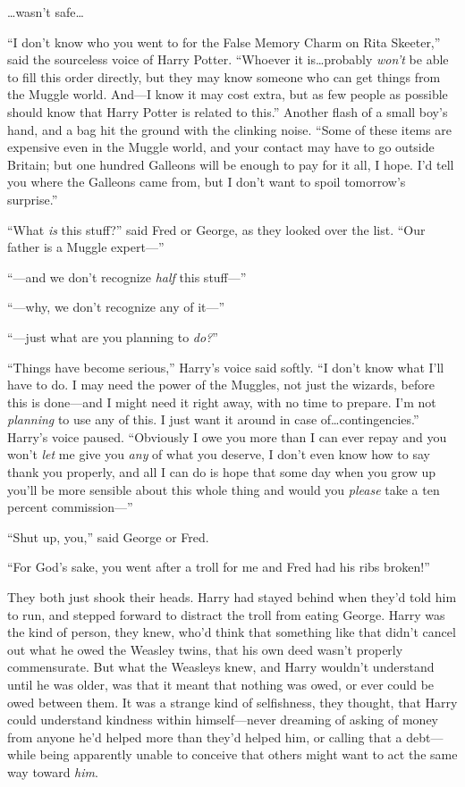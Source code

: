 …wasn’t safe…

“I don’t know who you went to for the False Memory Charm on Rita Skeeter,” said the sourceless voice of Harry Potter. “Whoever it is…probably \emph{won’t} be able to fill this order directly, but they may know someone who can get things from the Muggle world. And—I know it may cost extra, but as few people as possible should know that Harry Potter is related to this.” Another flash of a small boy’s hand, and a bag hit the ground with the clinking noise. “Some of these items are expensive even in the Muggle world, and your contact may have to go outside Britain; but one hundred Galleons will be enough to pay for it all, I hope. I’d tell you where the Galleons came from, but I don’t want to spoil tomorrow’s surprise.”

“What \emph{is} this stuff?” said Fred or George, as they looked over the list. “Our father is a Muggle expert—”

“—and we don’t recognize \emph{half} this stuff—”

“—why, we don’t recognize any of it—”

“—just what are you planning to \emph{do?}”

“Things have become serious,” Harry’s voice said softly. “I don’t know what I’ll have to do. I may need the power of the Muggles, not just the wizards, before this is done—and I might need it right away, with no time to prepare. I’m not \emph{planning} to use any of this. I just want it around in case of…contingencies.” Harry’s voice paused. “Obviously I owe you more than I can ever repay and you won’t \emph{let} me give you \emph{any} of what you deserve, I don’t even know how to say thank you properly, and all I can do is hope that some day when you grow up you’ll be more sensible about this whole thing and would you \emph{please} take a ten percent commission—”

“Shut up, you,” said George or Fred.

“For God’s sake, you went after a troll for me and Fred had his ribs broken!”

They both just shook their heads. Harry had stayed behind when they’d told him to run, and stepped forward to distract the troll from eating George. Harry was the kind of person, they knew, who’d think that something like that didn’t cancel out what he owed the Weasley twins, that his own deed wasn’t properly commensurate. But what the Weasleys knew, and Harry wouldn’t understand until he was older, was that it meant that nothing was owed, or ever could be owed between them. It was a strange kind of selfishness, they thought, that Harry could understand kindness within himself—never dreaming of asking of money from anyone he’d helped more than they’d helped him, or calling that a debt—while being apparently unable to conceive that others might want to act the same way toward \emph{him}.

